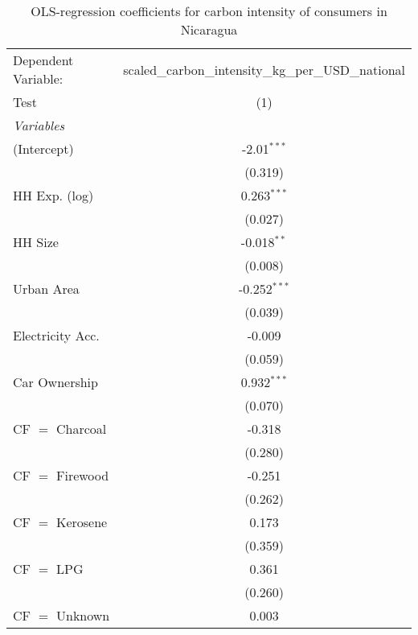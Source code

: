 
\begin{table}[htbp!]
   \centering
   \small
   \begin{adjustbox}{width = 1\textwidth, max height = 0.95\textheight, center}
      \begin{threeparttable}[b]
         \caption{\label{tab:OLS_1_NIC} OLS-regression coefficients for carbon intensity of consumers in Nicaragua}
         \begin{tabular}{lc}
            \tabularnewline \midrule \midrule
            Dependent Variable: & scaled\_carbon\_intensity\_kg\_per\_USD\_national\\        
            Test                & (1)\\  
            \midrule
            \emph{Variables}\\
            (Intercept)         & -2.01$^{***}$\\   
                                & (0.319)\\   
            HH Exp. (log)       & 0.263$^{***}$\\   
                                & (0.027)\\   
            HH Size             & -0.018$^{**}$\\   
                                & (0.008)\\   
            Urban Area          & -0.252$^{***}$\\   
                                & (0.039)\\   
            Electricity Acc.    & -0.009\\   
                                & (0.059)\\   
            Car Ownership       & 0.932$^{***}$\\   
                                & (0.070)\\   
            CF $=$ Charcoal     & -0.318\\   
                                & (0.280)\\   
            CF $=$ Firewood     & -0.251\\   
                                & (0.262)\\   
            CF $=$ Kerosene     & 0.173\\   
                                & (0.359)\\   
            CF $=$ LPG          & 0.361\\   
                                & (0.260)\\   
            CF $=$ Unknown      & 0.003\\   

\end{tabular}
\end{threeparttable}
\end{adjustbox}
\end{table}
